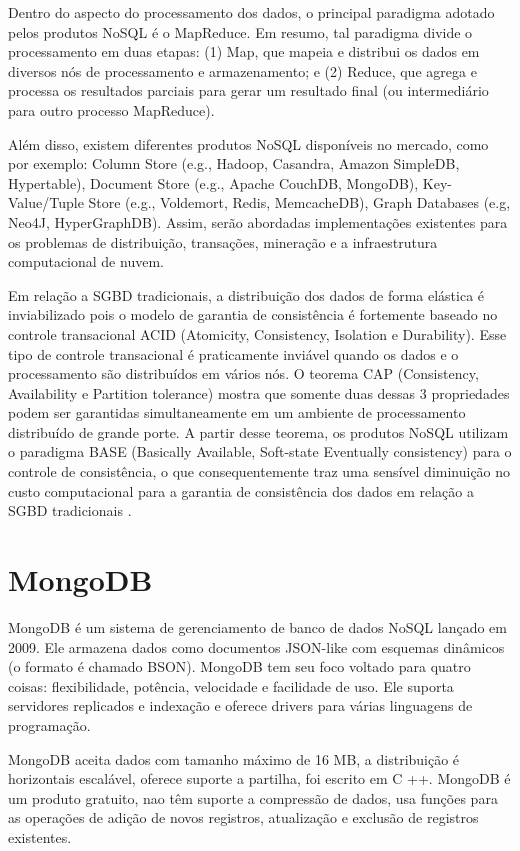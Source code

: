 \documentclass[12pt]{article}
\begin{document}
Dentro do aspecto do processamento dos dados, o principal paradigma adotado pelos produtos NoSQL é o MapReduce. Em resumo, tal paradigma divide o processamento em duas etapas: (1) Map, que mapeia e distribui os dados em diversos nós de processamento e armazenamento; e (2) Reduce, que agrega e processa os resultados parciais para gerar um resultado final (ou intermediário para outro processo MapReduce).

Além disso, existem diferentes produtos NoSQL disponíveis no mercado, como por exemplo: Column Store (e.g., Hadoop, Casandra, Amazon SimpleDB, Hypertable), Document Store (e.g., Apache CouchDB, MongoDB), Key-Value/Tuple Store (e.g., Voldemort, Redis, MemcacheDB), Graph Databases (e.g, Neo4J, HyperGraphDB). Assim, serão abordadas implementações existentes para os problemas de distribuição, transações, mineração e a infraestrutura computacional de nuvem.


Em relação a SGBD tradicionais, a distribuição dos dados de forma elástica é inviabilizado pois o modelo de garantia de consistência é fortemente baseado no controle transacional ACID (Atomicity, Consistency, Isolation e Durability). Esse tipo de controle transacional é praticamente inviável quando os dados e o processamento são distribuídos em vários nós. O teorema CAP (Consistency, Availability e Partition tolerance) mostra que somente duas dessas 3 propriedades podem ser garantidas simultaneamente em um ambiente de processamento distribuído de grande porte. A partir desse teorema, os produtos NoSQL utilizam o paradigma BASE (Basically Available, Soft-state Eventually consistency) para o controle de consistência, o que consequentemente traz uma
sensível diminuição no custo computacional para a garantia de consistência dos dados em relação a SGBD tradicionais \cite{mongodb}.

\section{MongoDB}
MongoDB é um sistema de gerenciamento de banco de dados NoSQL
lançado em 2009. Ele armazena dados como documentos JSON-like com
esquemas dinâmicos (o formato é chamado BSON). MongoDB tem seu
foco voltado para quatro coisas: flexibilidade, potência, velocidade e
facilidade de uso. Ele suporta servidores replicados e indexação e oferece
drivers para várias linguagens de programação.


MongoDB aceita dados com tamanho máximo de 16 MB, a distribuição é horizontais escalável, oferece suporte a partilha, foi escrito em C ++. MongoDB é um produto gratuito, nao têm suporte a compressão de dados, usa funções para as operações de adição de novos registros, atualização e exclusão de registros existentes. 
\end{document}
